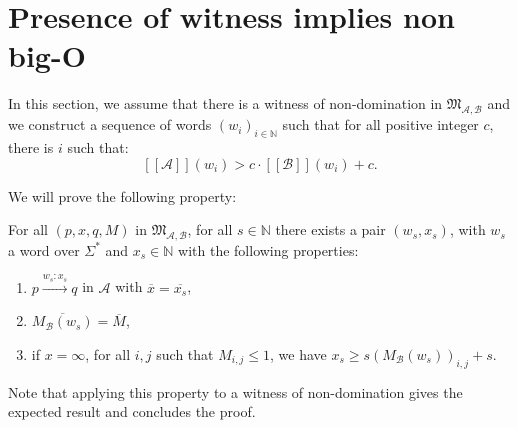 \documentclass{lmcs}
\theoremstyle{remark}
\newcommand{\N}{\mathbb{N}}
\newcommand{\ideal}{\mathfrak{M}}
\newcommand{\autA}{\mathcal{A}}
\newcommand{\autB}{\mathcal{B}}
\newcommand{\brfunc}[1]{[\![#1]\!]}
\newcommand{\funcA}{\brfunc{\autA}}
\newcommand{\funcB}{\brfunc{\autB}}
\theoremstyle{remark}
\begin{document}
\section{Presence of witness implies non big-O}
\label{2implies1}
\setcounter{case}{0}

In this section, we assume that there is a witness of non-domination in  $\ideal_{\autA,\autB}$ and we construct a sequence of words $(w_i)_{i\in \mathbb{N}}$ such that for all positive integer $c$, there is $i$ such that: 
\[
\funcA(w_i) > c\cdot \funcB(w_i) + c.
\]

We will prove the following property:

\begin{prop}
\label{prop:words-construct}
For all $(p,x,q,M)$ in $\ideal_{\autA,\autB}$, for all $s\in \N$ there exists a pair $(w_s,x_s)$, with $w_s$ a word over $\Sigma^*$ and $x_s\in \N$ with the following properties: 
\begin{enumerate}[label={\normalfont(\arabic*)}]
\item $p \xrightarrow{w_s:x_s} q$ in $\autA$ with $\overline{x} = \overline {x_s}$,
\item $\overline{M_\autB(w_s)} = \overline{M}$,  
\item if $x = \infty$, for all $i,j$ such that $M_{i,j} \leq 1$, we have $x_s \geq s (M_\autB(w_s))_{i,j} + s$.
\end{enumerate}
\end{prop}

Note that applying this property to a witness of non-domination gives the expected result and concludes the proof.
\end{document}
